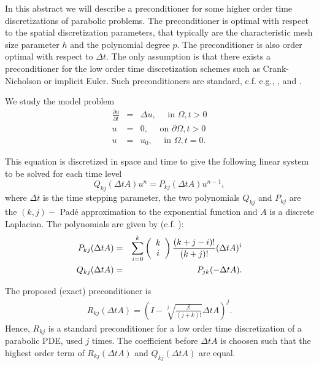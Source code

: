 \documentclass{report}
\begin{document}
In this abstract we will describe a preconditioner for some higher
order time discretizations of parabolic problems.
The preconditioner is optimal with respect to the spatial
discretization parameters, that typically are the characteristic mesh
size parameter $h$ and the polynomial degree $p$.
The preconditioner is also order optimal with respect to $\Delta t$.
The only assumption is that there exists a preconditioner for the low
order time
discretization schemes such as Crank-Nicholson or implicit Euler.
Such preconditioners are standard, c.f. e.g., \cite{BD},
\cite{olshanskii00convergence} and \cite{Thomee}.

We study the model problem
\begin{eqnarray*}
\frac{\partial u}{\partial t} &=& \Delta u, \quad \mbox{ in } \Omega, t > 0 \\
u &=& 0, \quad \mbox{ on } \partial \Omega, t>0 \\
u &=& u_0, \quad \mbox{ in } \Omega, t=0.
\end{eqnarray*}

This equation is discretized in space and time to give the
following linear system to be solved for each time level
\begin{equation*}
Q_{kj} (\Delta t A) u^n = P_{kj} (\Delta t A) u^{n-1},
\end{equation*}
where $\Delta t $ is the time stepping parameter, the two polynomials
$Q_{kj}$ and $P_{kj}$ are the $(k,j)-$ Pad\'{e} approximation to the
exponential function and $A$ is a discrete Laplacian.
The polynomials are given by (c.f. \cite{Thomee}):
\begin{eqnarray*}
P_{kj}(\Delta t A )&=&
\sum_{i=0}^k \left( \begin{array}{c c}
k \\
i
\end{array} \right) \frac {(k+j-i)!}{(k+j)!} (\Delta t A)^i \\
Q_{kj}(\Delta t A )&=&P_{jk}(-\Delta t A ).
\end{eqnarray*}

The proposed (exact) preconditioner is
\begin{eqnarray*}
R_{kj} (\Delta t A) =\left( I- \sqrt[j]{\frac {j!}{(j+k)!}}\Delta t A \right)^j.
\end{eqnarray*}
Hence, $R_{kj}$ is a standard preconditioner for a low
order time discretization of a parabolic PDE, used
$j$ times.
The coefficient before $\Delta t A$ is choosen such that the
highest order term of $R_{kj}(\Delta t A)$
and $Q_{kj} (\Delta t A)$ are equal.
\end{document}
